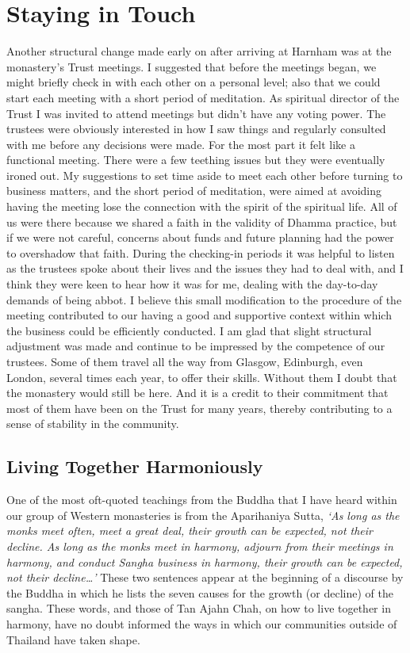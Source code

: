 \chapter{Staying in Touch}

Another structural change made early on after arriving at Harnham was at
the monastery's Trust meetings. I suggested that before the meetings
began, we might briefly check in with each other on a personal level;
also that we could start each meeting with a short period of meditation.
As spiritual director of the Trust I was invited to attend meetings but
didn't have any voting power. The trustees were obviously interested in
how I saw things and regularly consulted with me before any decisions
were made. For the most part it felt like a functional meeting. There
were a few teething issues but they were eventually ironed out. My
suggestions to set time aside to meet each other before turning to
business matters, and the short period of meditation, were aimed at
avoiding having the meeting lose the connection with the spirit of the
spiritual life. All of us were there because we shared a faith in the
validity of Dhamma practice, but if we were not careful, concerns about
funds and future planning had the power to overshadow that faith. During
the checking-in periods it was helpful to listen as the trustees spoke
about their lives and the issues they had to deal with, and I think they
were keen to hear how it was for me, dealing with the day-to-day demands
of being abbot. I believe this small modification to the procedure of
the meeting contributed to our having a good and supportive context
within which the business could be efficiently conducted. I am glad that
slight structural adjustment was made and continue to be impressed by
the competence of our trustees. Some of them travel all the way from
Glasgow, Edinburgh, even London, several times each year, to offer their
skills. Without them I doubt that the monastery would still be here. And
it is a credit to their commitment that most of them have been on the
Trust for many years, thereby contributing to a sense of stability in
the community.

\section{Living Together Harmoniously}

One of the most oft-quoted teachings from the Buddha that I have heard
within our group of Western monasteries is from the
Aparihaniya Sutta\cite{aparihaniya}, \emph{`As long as the monks meet often,
meet a great deal, their growth can be expected, not their decline. As
long as the monks meet in harmony, adjourn from their meetings in
harmony, and conduct Sangha business in harmony, their growth can be
expected, not their decline\ldots'} These two sentences appear at the
beginning of a discourse by the Buddha in which he lists the seven
causes for the growth (or decline) of the sangha. These words, and those
of Tan Ajahn Chah, on how to live together in harmony, have no doubt
informed the ways in which our communities outside of Thailand have
taken shape.

